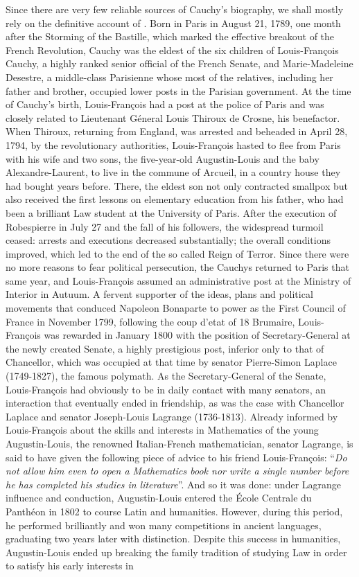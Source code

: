 Since there are very few reliable sources of Cauchy's biography, we shall mostly rely on the definitive account of \cite{belhoste_1991_1}. Born in Paris in August 21, 1789, one month after the Storming of the Bastille, which marked the effective breakout of the French Revolution, Cauchy was the eldest of the six children of Louis-Fran\c{c}ois Cauchy, a highly ranked senior official of the French Senate, and Marie-Madeleine Desestre, a middle-class Parisienne whose most of the relatives, including her father and brother, occupied lower posts in the Parisian government. At the time of Cauchy's birth, Louis-Fran\c{c}ois had a post at the police of Paris and was closely related to Lieutenant G\'eneral Louis Thiroux de Crosne, his benefactor. When Thiroux, returning from England, was arrested and beheaded in April 28, 1794, by the revolutionary authorities, Louis-Fran\c{c}ois hasted to flee from Paris with his wife and two sons, the five-year-old Augustin-Louis and the baby Alexandre-Laurent, to live in the commune of Arcueil, in a country house they had bought years before. There,  the eldest son not only contracted smallpox but also received the first lessons on elementary education from his father, who had been a brilliant Law student at the University of Paris. After the execution of Robespierre in July 27 and the fall of his followers, the widespread turmoil ceased: arrests and executions decreased substantially; the overall conditions improved, which led to the end of the so called Reign of Terror. Since there were no more reasons to fear political persecution, the Cauchys returned to Paris that same year, and Louis-Fran\c{c}ois assumed an administrative post at the Ministry of Interior in Autuum. A fervent supporter of the ideas, plans and political movements that conduced Napoleon Bonaparte to power as the First Council of France in November 1799, following the coup d'etat of 18 Brumaire, Louis-Fran\c{c}ois was rewarded in January 1800 with the position of Secretary-General at the newly created Senate, a highly prestigious post, inferior only to that of Chancellor, which was occupied at that time by senator Pierre-Simon Laplace (1749-1827), the famous polymath. As the Secretary-General of the Senate, Louis-Fran\c{c}ois had obviously to be in daily contact with many senators, an interaction that eventually ended in friendship, as was the case with Chancellor Laplace and senator Joseph-Louis Lagrange (1736-1813). Already informed by Louis-Fran\c{c}ois about the skills and interests in Mathematics of the young Augustin-Louis, the renowned Italian-French mathematician, senator Lagrange, is said to have given the following piece of advice to his friend Louis-Fran\c{c}ois: ``\emph{Do not allow him even to open a Mathematics book nor write a single number before he has completed his studies in literature}''. And so it was done: under Lagrange influence and conduction, Augustin-Louis entered the \'Ecole Centrale du Panth\'eon in 1802 to course Latin and humanities. However, during this period, he performed brilliantly and won many competitions in ancient languages, graduating two years later with distinction. Despite this success in humanities, Augustin-Louis ended up breaking the family tradition of studying Law in order to satisfy his early interests in 